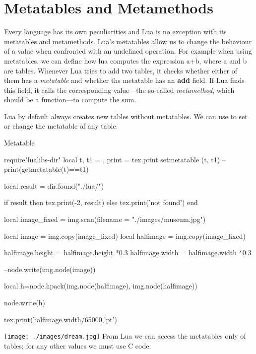 \chapter{Metatables and Metamethods}

\def\textdblunderscore#1{{\bfseries \textunderscore\hskip1pt\textunderscore#1}}

Every language has its own peculiarities and Lua is no exception with its metatables and metamethods. Lua’s metatables allow us to change the behaviour of a value when confronted with an undefined operation. For example when using metatables, we can define how lua computes the expression a+b, where a and b are tables. Whenever Lua tries to add two tables, it checks whether either of them has a \emph{metatable} and whether ths metatable has an \textdblunderscore{add} field. If Lua finds this field, it calls the corresponding value---the so-called \emph{metamethod}, which should be a function---to compute the sum.

Lua by default always creates new tables without metatables. We can use  to set or change the metatable of any table.

\begin{texexample}{Metatable}{}
\begin{luacode}
require"lualibs-dir"
local t, t1 = {}, {}
        print = tex.print
setmetatable (t, t1)
-- print(getmetatable(t)==t1)

local result = dir.found("./lua/")

if result then tex.print(-2, result) else tex.print('not found')  end

local image_fixed = img.scan({filename = "./images/museum.jpg"})

local image     = img.copy(image_fixed)
local halfimage = img.copy(image_fixed)

halfimage.height = halfimage.height *0.3
halfimage.width  = halfimage.width  *0.3

--node.write(img.node(image))


local h=node.hpack(img.node(halfimage), img.node(halfimage))

node.write(h)

tex.print(halfimage.width/65000,'pt')

\end{luacode}
\end{texexample}
\texttt{[image: ./images/dream.jpg]}
From Lua we can access the metatables only of tables; for any other values we must use C code. 
